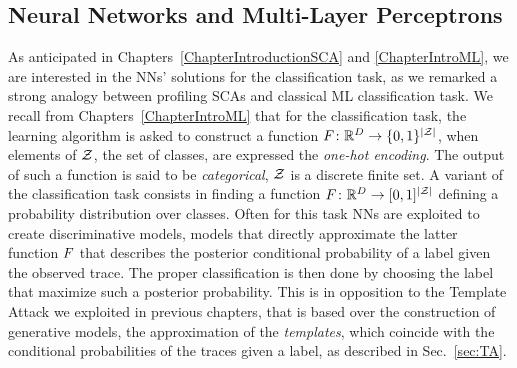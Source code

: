 \subsection{Neural Networks and Multi-Layer Perceptrons}
As anticipated in Chapters~\ref{ChapterIntroductionSCA} and \ref{ChapterIntroML}, we are interested in the NNs' solutions for the classification task, as we remarked a strong analogy between profiling SCAs and classical ML classification task. We recall from Chapters~\ref{ChapterIntroML} that for the classification task, the learning algorithm is asked to construct a function $F\colon \mathbb{R}^D \rightarrow \{0,1\}^{\lvert\mathcal{Z}\rvert}$, when elements of $\mathcal{Z}$, \ie the set of classes, are expressed \via the \emph{one-hot encoding}. The output of such a function is said to be \emph{categorical}, \ie $\mathcal{Z}$ is a discrete finite set. A variant of the classification task consists in finding a function $F\colon \mathbb{R}^D \rightarrow [0,1]^{\lvert\mathcal{Z}\rvert}$ defining a probability distribution over classes. Often for this task NNs are exploited to create discriminative models, \ie models that directly approximate the latter function $F$ that describes the posterior conditional probability of a label given the observed trace. The proper classification is then done by choosing the label that maximize such a posterior probability. This is in opposition to the Template Attack we exploited in previous chapters, that is based over the construction of generative models, \ie the approximation of the \emph{templates}, which coincide with the conditional probabilities of the traces given a label, as described in Sec.~\ref{sec:TA}.\\

